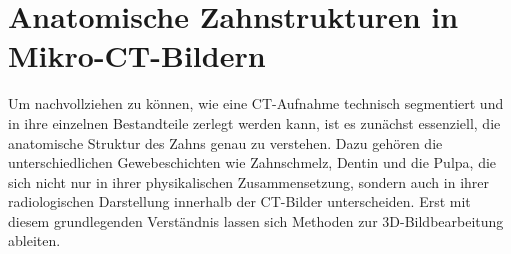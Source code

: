 \pagebreak

\section{Anatomische Zahnstrukturen in Mikro-CT-Bildern}
\label{sec:domänenspezifisch} Um nachvollziehen zu können, wie eine \ac{CT}-Aufnahme
technisch segmentiert und in ihre einzelnen Bestandteile zerlegt werden kann, ist
es zunächst essenziell, die anatomische Struktur des Zahns genau zu verstehen. Dazu
gehören die unterschiedlichen Gewebeschichten wie Zahnschmelz, Dentin und die
Pulpa, die sich nicht nur in ihrer physikalischen Zusammensetzung, sondern auch
in ihrer radiologischen Darstellung innerhalb der \ac{CT}-Bilder unterscheiden.
Erst mit diesem grundlegenden Verständnis lassen sich Methoden zur 3D-Bildbearbeitung
ableiten.

